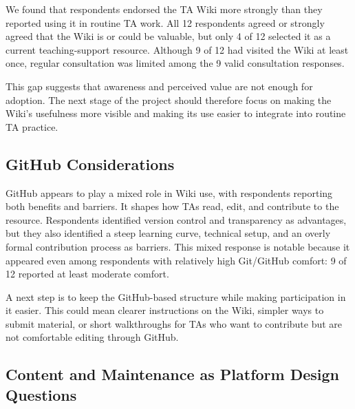 \documentclass[11pt]{article}
\newcommand{\td}[1]{\item \textcolor{red!70!black}{TODO: #1}}
\begin{document}
We found that respondents endorsed the TA Wiki more strongly than they reported using it in routine TA work. All 12 respondents agreed or strongly agreed that the Wiki is or could be valuable, but only 4 of 12 selected it as a current teaching-support resource. Although 9 of 12 had visited the Wiki at least once, regular consultation was limited among the 9 valid consultation responses.

This gap suggests that awareness and perceived value are not enough for adoption. The next stage of the project should therefore focus on making the Wiki's usefulness more visible and making its use easier to integrate into routine TA practice.

\subsection{GitHub Considerations}

GitHub appears to play a mixed role in Wiki use, with respondents reporting both benefits and barriers. It shapes how TAs read, edit, and contribute to the resource. Respondents identified version control and transparency as advantages, but they also identified a steep learning curve, technical setup, and an overly formal contribution process as barriers. This mixed response is notable because it appeared even among respondents with relatively high Git/GitHub comfort: 9 of 12 reported at least moderate comfort.

A next step is to keep the GitHub-based structure while making participation in it easier. This could mean clearer instructions on the Wiki, simpler ways to submit material, or short walkthroughs for TAs who want to contribute but are not comfortable editing through GitHub.

\subsection{Content and Maintenance as Platform Design Questions}
\end{document}
